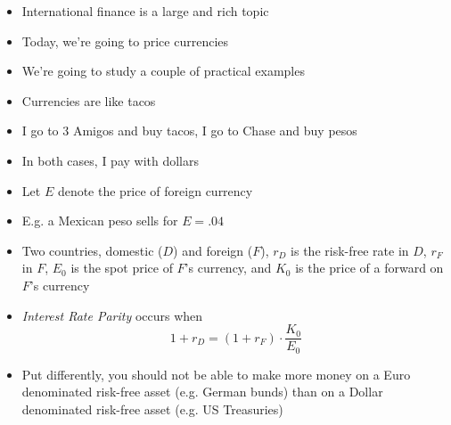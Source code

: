 \documentclass{beamer}
\begin{document}
\begin{frame}{}
	\begin{itemize}
		\item International finance is a large and rich topic
		\item Today, we're going to price currencies
		\item We're going to study a couple of practical examples
        \item Currencies are like tacos
        \item I go to 3 Amigos and buy tacos, I go to Chase and buy pesos
        \item In both cases, I pay with dollars
        \item Let $E$ denote the price of foreign currency
		\item E.g. a Mexican peso sells for $E=.04$ 
    \end{itemize}
\end{frame}

\begin{frame}{}
    \begin{itemize}
        \item Two countries, domestic ($D$) and foreign ($F$), $r_{D}$ is the risk-free rate in $D$, $r_{F}$ in $F$, $E_{0}$ is the spot price of $F$'s currency, and $K_{0}$ is the price of a forward on $F$'s currency
		\item \textit{Interest Rate Parity} occurs when
            \begin{equation}
				\boxed{1+r_{D}=(1+r_{F})\cdot\frac{K_{0}}{E_{0}}}
            \end{equation}
		\item Put differently, you should not be able to make more money on a Euro denominated risk-free asset (e.g. German bunds) than on a Dollar denominated risk-free asset (e.g. US Treasuries)
    \end{itemize}
\end{frame}
\end{document}
